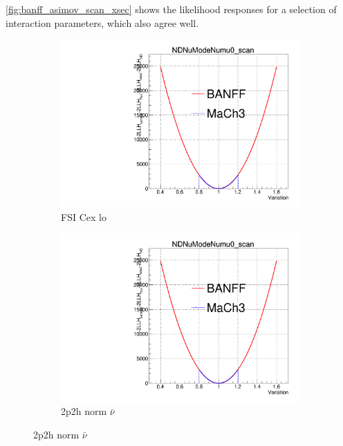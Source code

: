 \autoref{fig:banff_asimov_scan_xsec} shows the likelihood responses for a selection of interaction parameters, which also agree well.
\begin{figure}[h]
	\begin{subfigure}[t]{0.24\textwidth}
		\includegraphics[width=\textwidth, trim={0mm 0mm 0mm 11mm}, clip, page=105]{figures/mach3/banff/Asimov_scan_20July_flux_Full_LLHscan_18July_BeRPA_U_ND280logL_scan}
		\caption{FSI Cex lo}
	\end{subfigure}
	\begin{subfigure}[t]{0.24\textwidth}
		\includegraphics[width=\textwidth, trim={0mm 0mm 0mm 11mm}, clip, page=111]{figures/mach3/banff/Asimov_scan_20July_flux_Full_LLHscan_18July_BeRPA_U_ND280logL_scan}
		\caption{2p2h norm $\bar{\nu}$}
	\end{subfigure}

\end{figure}
